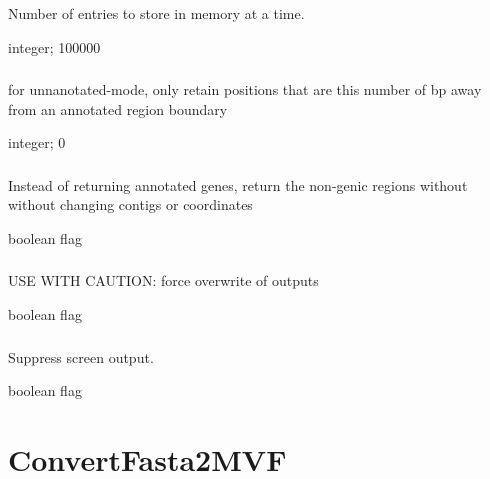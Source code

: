 \documentclass[letterpaper,11pt,english]{sphinxmanual}
\begin{document}
\subsubsection{}
\label{\detokenize{prog_desc:line-buffer-linebuffer}}
 Number of entries to store in memory at a time.

 integer;  100000


\subsubsection{}
\label{\detokenize{prog_desc:nongenic-margin-nongenicmargin}}
 for \textendash{}unnanotated-mode, only retain positions that are this number of bp away from an annotated region boundary

 integer;  0


\subsubsection{}
\label{\detokenize{prog_desc:nongenic-mode-nongenicmode}}
 Instead of returning annotated genes, return the non-genic regions without without changing contigs or coordinates

 boolean flag


\subsubsection{}
\label{\detokenize{prog_desc:overwrite}}
 USE WITH CAUTION: force overwrite of outputs

 boolean flag


\subsubsection{}
\label{\detokenize{prog_desc:quiet}}
 Suppress screen output.

 boolean flag


\section{ConvertFasta2MVF}
\label{\detokenize{prog_desc:convertfasta2mvf}}
\end{document}
